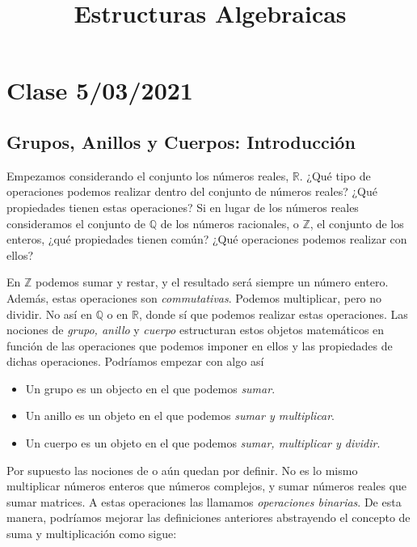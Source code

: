 \documentclass[a4paper,11pt]{amsart}
\date{}
\date{}
\theoremstyle{plain}
\theoremstyle{definition}
\theoremstyle{remark}
\begin{document}
\title{Estructuras Algebraicas}
\author{}
\maketitle


\tableofcontents


\section{Clase 5/03/2021}

\subsection{Grupos, Anillos y Cuerpos: Introducción}


Empezamos considerando el conjunto los números reales, $\mathbb{R}$. ¿Qué tipo de operaciones podemos realizar dentro del conjunto de números reales? ¿Qué propiedades tienen estas operaciones? Si en lugar de los números reales consideramos el conjunto de $\mathbb{Q}$ de los números racionales, o $\mathbb{Z}$, el conjunto de los enteros, ¿qué propiedades tienen común? ¿Qué operaciones podemos realizar con ellos? 

En $\mathbb{Z}$ podemos sumar y restar, y el resultado será siempre un número entero. Además, estas operaciones son \textit{commutativas}. Podemos multiplicar, pero no dividir. No así en $\mathbb{Q}$ o en $\mathbb{R}$, donde sí que podemos realizar estas operaciones. Las nociones de \textit{grupo, anillo} y \textit{cuerpo} estructuran estos objetos matemáticos en función de las operaciones que podemos imponer en ellos y las propiedades de dichas operaciones. Podríamos empezar con algo así 
\begin{itemize}
    \item Un grupo es un objecto en el que podemos \textit{sumar}.
    \item Un anillo es un objeto en el que podemos \textit{sumar y multiplicar}.
    \item Un cuerpo es un objeto en el que podemos \textit{sumar, multiplicar y dividir}.
\end{itemize}

Por supuesto las nociones de  o  aún quedan por definir. No es lo mismo multiplicar números enteros que números complejos, y sumar números reales que sumar matrices. A estas operaciones las llamamos \textit{operaciones binarias}. De esta manera, podríamos mejorar las definiciones anteriores abstrayendo el concepto de suma y multiplicación como sigue: 
\end{document}
